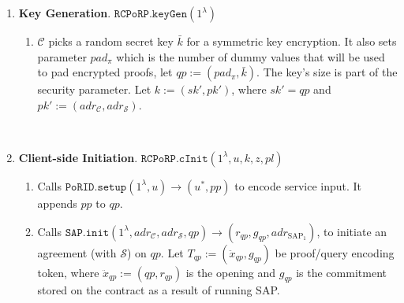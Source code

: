 \begin{enumerate}
\item\label{RC-PoR-P::KeyGen} \textbf{Key Generation}. $\mathtt{RCPoRP}.\mathtt{keyGen}(1^{\scriptscriptstyle\lambda})$
\begin{enumerate}

\item  $\mathcal C$  picks a random secret key  $\bar{k}$ for a symmetric key encryption. It also sets  parameter $pad_{\scriptscriptstyle \pi}$ which is the number of  dummy values that will be used to pad encrypted proofs,  let $qp:=(pad_{\scriptscriptstyle \pi}, \bar{k})$. The key's size is part of the security parameter. Let  ${k}:=(sk',pk')$, where  $sk'=qp$ and $pk':=(adr_{\scriptscriptstyle\mathcal{C}},adr_{\scriptscriptstyle\mathcal{S}})$. 






\end{enumerate}

\

\item \textbf{Client-side Initiation}. $\mathtt{RCPoRP}.\mathtt{cInit}(1^\lambda, u,{k}, z,pl)$
\begin{enumerate}

\item Calls $\mathtt{PoRID.setup}(1^{\lambda}, u)\rightarrow (u^{\scriptscriptstyle *},pp)$ to encode service input. It appends $pp$ to $qp$.


\item  Calls $\mathtt{SAP.init}(1^{\scriptscriptstyle\lambda}, adr_{\scriptscriptstyle\mathcal{C}}, adr_{\scriptscriptstyle\mathcal{S}},qp )\rightarrow(r_{\scriptscriptstyle qp}, g_{\scriptscriptstyle qp}, adr_{\scriptscriptstyle\text{SAP}_{\scriptscriptstyle 1}})$, to initiate an agreement (with $\mathcal{S}$) on $qp$.  Let $T_{\scriptscriptstyle qp}:=(\ddot{x}_{\scriptscriptstyle qp}, g_{\scriptscriptstyle qp})$ be proof/query encoding token,  where  $\ddot{x}_{\scriptscriptstyle qp}:=(qp,r_{\scriptscriptstyle qp})$ is the opening and $g_{\scriptscriptstyle qp}$ is the commitment stored on the contract as a result of running   SAP. 



\end{enumerate}
\end{enumerate}
